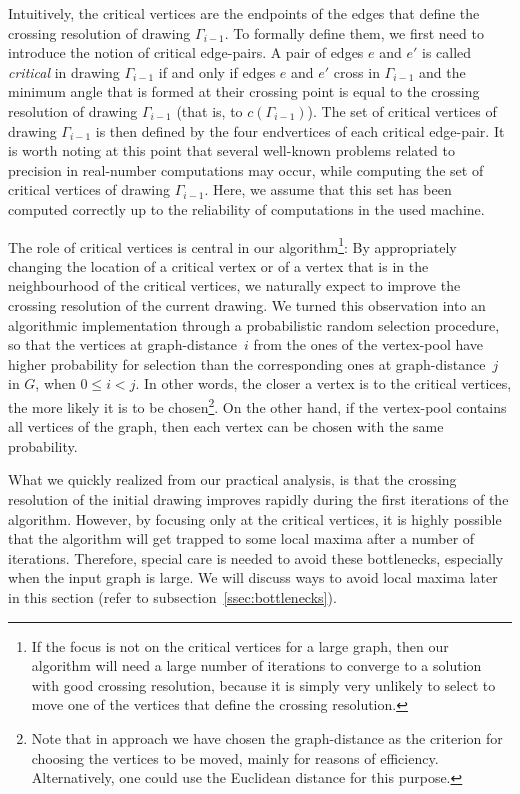 \documentclass{comjnl}
\begin{document}
Intuitively, the critical vertices are the endpoints of the edges that define the crossing resolution of drawing $\Gamma_{i-1}$. To formally define them, we first need to introduce the notion of critical edge-pairs. A pair of edges $e$ and $e'$ is called \emph{critical} in drawing $\Gamma_{i-1}$ if and only if edges $e$ and $e'$ cross in $\Gamma_{i-1}$ and the minimum angle that is formed at their crossing point is equal to the crossing resolution of drawing $\Gamma_{i-1}$ (that is, to $c(\Gamma_{i-1})$). The set of critical vertices of drawing $\Gamma_{i-1}$ is then defined by the four endvertices of each critical edge-pair. It is worth noting at this point that several well-known problems related to precision in real-number computations may occur, while computing the set of critical vertices of drawing $\Gamma_{i-1}$. Here, we assume that this set has been computed correctly up to the reliability of computations in the used machine. 

The role of critical vertices is central in our algorithm\footnote{If the focus is not on the critical vertices for a large graph, then our algorithm will need a large number of iterations to converge to a solution with good crossing resolution, because it is simply very unlikely to select to move one of the vertices that define the crossing resolution.}: By appropriately changing the location of a critical vertex or of a vertex that is in the neighbourhood of the critical vertices, we naturally expect to improve the crossing resolution of the current drawing. We turned this observation into an algorithmic implementation through a probabilistic random selection procedure, so that the vertices at graph-distance~$i$ from the ones of the vertex-pool have higher probability for selection than the corresponding ones at graph-distance~$j$  in $G$, when $0 \leq i<j$. In other words, the closer a vertex is to the critical vertices, the more likely it is to be chosen\footnote{Note that in approach we have chosen the graph-distance as the criterion for choosing the vertices to be moved, mainly for reasons of efficiency. Alternatively, one could use the Euclidean distance for this purpose.}. On the other hand, if the vertex-pool contains all vertices of the graph, then each vertex can be chosen with the same probability.

What we quickly realized from our practical analysis, is that the crossing resolution of the initial drawing improves rapidly during the first iterations of the algorithm. However, by focusing only at the critical vertices, it is highly possible that the algorithm will get trapped to some local maxima after a number of iterations. Therefore, special care is needed to avoid these bottlenecks, especially when the input graph is large. We will discuss ways to avoid local maxima later in this section (refer to subsection~\ref{ssec:bottlenecks}).
\end{document}
